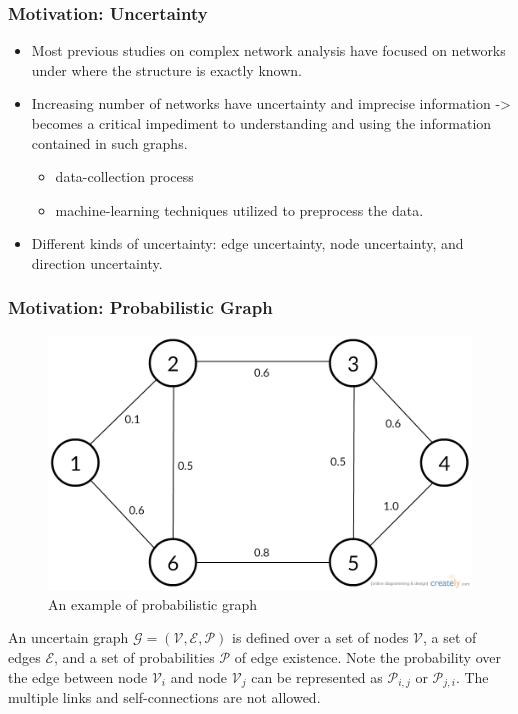 \documentclass[9pt]{beamer}
\begin{document}
\begin{frame}
\frametitle{Motivation: Uncertainty}
\begin{itemize}
\item Most previous studies on complex network analysis have focused on networks under where the structure is exactly known. 
\item Increasing number of networks have uncertainty and imprecise information -> becomes a critical impediment to understanding and using the information contained in such graphs.
\begin{itemize}
\item data-collection process
\item machine-learning techniques utilized to preprocess the data.
\end{itemize}
\item Different kinds of uncertainty: edge uncertainty, node uncertainty, and direction uncertainty.
\end{itemize}

\end{frame}


\begin{frame}
\frametitle{Motivation: Probabilistic Graph}
\begin{figure}[H]
\centering
\includegraphics[scale = 0.2]{probabilistic_graph.png}
\caption{An example of probabilistic graph}
\end{figure}
\vspace{-0.28in}
An uncertain graph $\mathcal{G = (V,E,P)}$ is defined over a set of nodes $\mathcal{V}$, a set of edges $\mathcal{E}$, and a set of probabilities $\mathcal{P}$ of edge existence. Note the probability over the edge between node $\mathcal{V}_i$ and node $\mathcal{V}_j$ can be represented as $\mathcal{P}_{i,j}$ or $\mathcal{P}_{j,i}$. The multiple links and self-connections are not allowed.
\end{frame}
\end{document}
